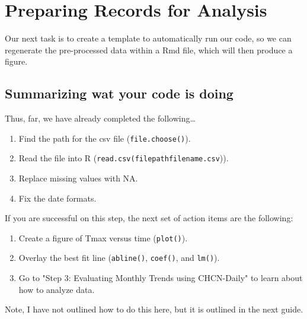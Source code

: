 \documentclass{article}\usepackage[]{graphicx}\usepackage[]{color}
\begin{document}
\section{Preparing Records for Analysis}

Our next task is to create a template to automatically run our code, so we can regenerate the pre-processed data within a Rmd file, which will then produce a figure. 

\subsection{Summarizing wat your code is doing}




Thus, far, we have already completed the following\ldots

\begin{enumerate}
  \item Find the path for the csv file (\texttt{file.choose()}).
  \item Read the file into R (\texttt{read.csv(filepathfilename.csv})).
  \item Replace missing values with NA.
  \item Fix the date formats.
\end{enumerate}


If you are successful on this step, the next set of action items are the following: 

\begin{enumerate}
  \item Create a figure of Tmax versus time (\texttt{plot()}).
  \item Overlay the best fit line (\texttt{abline()}, \texttt{coef()}, and \texttt{lm()}).
  \item Go to "Step 3: Evaluating Monthly Trends using CHCN-Daily" to learn about how to analyze data.
\end{enumerate}

Note, I have not outlined how to do this here, but it is outlined in the next guide. 
\end{document}
